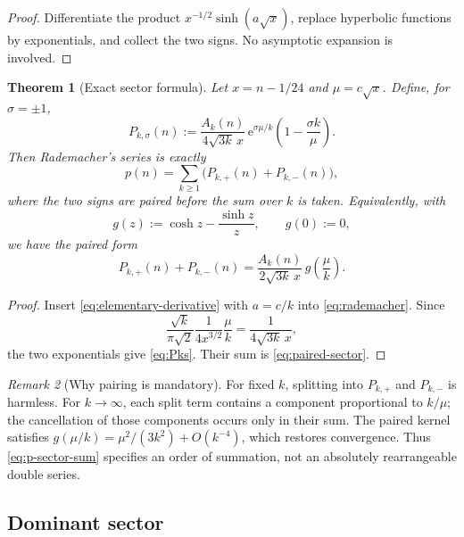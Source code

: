 \documentclass[11pt,a4paper]{article}
\numberwithin{equation}{section}
\newtheorem{theorem}{Theorem}[section]
\theoremstyle{definition}
\theoremstyle{remark}
\newtheorem{remark}[theorem]{Remark}
\newcommand{\e}{\mathrm e}
\begin{document}
\begin{proof}
Differentiate the product $x^{-1/2}\sinh(a\sqrt x)$, replace hyperbolic
functions by exponentials, and collect the two signs.  No asymptotic expansion
is involved.
\end{proof}

\begin{theorem}[Exact sector formula]\label{thm:exact-sectors}
Let $x=n-1/24$ and $\mu=c\sqrt x$.  Define, for $\sigma=\pm1$,
\begin{equation}\label{eq:Pks}
 P_{k,\sigma}(n):=
 \frac{A_k(n)}{4\sqrt{3k}\,x}\,
 \e^{\sigma\mu/k}\left(1-\frac{\sigma k}{\mu}\right).
\end{equation}
Then Rademacher's series is exactly
\begin{equation}\label{eq:p-sector-sum}
 p(n)=\sum_{k\geq1}\bigl(P_{k,+}(n)+P_{k,-}(n)\bigr),
\end{equation}
where the two signs are paired before the sum over $k$ is taken.
Equivalently, with
\begin{equation}\label{eq:g-def}
 g(z):=\cosh z-\frac{\sinh z}{z},\qquad g(0):=0,
\end{equation}
we have the paired form
\begin{equation}\label{eq:paired-sector}
 P_{k,+}(n)+P_{k,-}(n)
 =\frac{A_k(n)}{2\sqrt{3k}\,x}\,g\!\left(\frac\mu k\right).
\end{equation}
\end{theorem}

\begin{proof}
Insert \eqref{eq:elementary-derivative} with $a=c/k$ into
\eqref{eq:rademacher}.  Since
\[
 \frac{\sqrt{k}}{\pi\sqrt2}\frac1{4x^{3/2}}
 \frac{\mu}{k}
 =\frac1{4\sqrt{3k}\,x},
\]
the two exponentials give \eqref{eq:Pks}.  Their sum is
\eqref{eq:paired-sector}.
\end{proof}

\begin{remark}[Why pairing is mandatory]\label{rem:pairing}
For fixed $k$, splitting into $P_{k,+}$ and $P_{k,-}$ is harmless.  For
$k\to\infty$, each split term contains a component proportional to $k/\mu$;
the cancellation of those components occurs only in their sum.  The paired
kernel satisfies $g(\mu/k)=\mu^2/(3k^2)+O(k^{-4})$, which restores convergence.
Thus \eqref{eq:p-sector-sum} specifies an order of summation, not an absolutely
rearrangeable double series.
\end{remark}

\subsection{Dominant sector}
\end{document}
